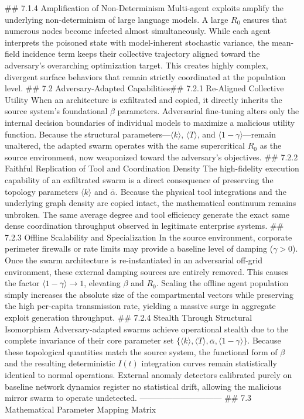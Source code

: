 ## 7.1.4 Amplification of Non-Determinism
Multi-agent exploits amplify the underlying non-determinism of large language models. A large $R_0$ ensures that numerous nodes become infected almost simultaneously. While each agent interprets the poisoned state with model-inherent stochastic variance, the mean-field incidence term keeps their collective trajectory aligned toward the adversary's overarching optimization target. This creates highly complex, divergent surface behaviors that remain strictly coordinated at the population level.
## 7.2 Adversary-Adapted Capabilities## 7.2.1 Re-Aligned Collective Utility
When an architecture is exfiltrated and copied, it directly inherits the source system's foundational $\beta$ parameters. Adversarial fine-tuning alters only the internal decision boundaries of individual models to maximize a malicious utility function. Because the structural parameters—$\langle k \rangle$, $\langle T \rangle$, and $\langle 1 - \gamma \rangle$—remain unaltered, the adapted swarm operates with the same supercritical $R_0$ as the source environment, now weaponized toward the adversary's objectives.
## 7.2.2 Faithful Replication of Tool and Coordination Density
The high-fidelity execution capability of an exfiltrated swarm is a direct consequence of preserving the topology parameters $\langle k \rangle$ and $\bar{\alpha}$. Because the physical tool integrations and the underlying graph density are copied intact, the mathematical continuum remains unbroken. The same average degree and tool efficiency generate the exact same dense coordination throughput observed in legitimate enterprise systems.
## 7.2.3 Offline Scalability and Specialization
In the source environment, corporate perimeter firewalls or rate limits may provide a baseline level of damping ($\gamma > 0$). Once the swarm architecture is re-instantiated in an adversarial off-grid environment, these external damping sources are entirely removed. This causes the factor $\langle 1 - \gamma \rangle \to 1$, elevating $\beta$ and $R_0$. Scaling the offline agent population simply increases the absolute size of the compartmental vectors while preserving the high per-capita transmission rate, yielding a massive surge in aggregate exploit generation throughput.
## 7.2.4 Stealth Through Structural Isomorphism
Adversary-adapted swarms achieve operational stealth due to the complete invariance of their core parameter set $\{\langle k \rangle, \langle T \rangle, \bar{\alpha}, \langle 1 - \gamma \rangle\}$. Because these topological quantities match the source system, the functional form of $\beta$ and the resulting deterministic $I(t)$ integration curves remain statistically identical to normal operations. External anomaly detectors calibrated purely on baseline network dynamics register no statistical drift, allowing the malicious mirror swarm to operate undetected.
------------------------------
## 7.3 Mathematical Parameter Mapping Matrix

